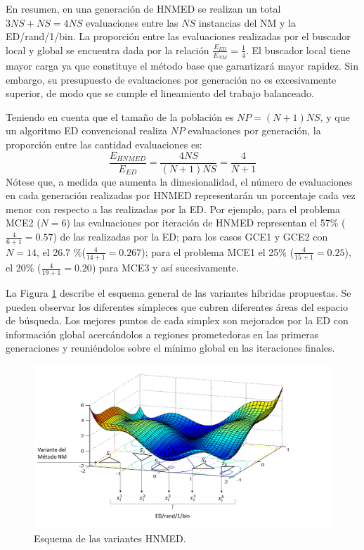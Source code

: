 En resumen, en una generación de HNMED se realizan un total $3NS+NS=4NS$ evaluaciones entre las $NS$ instancias del NM y la ED/rand/1/bin. La proporción entre las evaluaciones realizadas por el buscador local y global se encuentra dada por la relación $\frac{E_{ED}}{E_{NM}}=\frac{1}{4}$. El buscador local tiene mayor carga ya que constituye el método base que garantizará mayor rapidez. Sin embargo, su presupuesto de evaluaciones por generación no es excesivamente superior, de modo que se cumple el lineamiento del trabajo balanceado. 

Teniendo en cuenta que el tamaño de la población es $NP=(N+1)NS$, y que un algoritmo ED convencional realiza $NP$ evaluaciones por generación, la proporción entre las cantidad evaluaciones es:
\begin{equation}\label{eq:relación de evaluaciones}
\frac{E_{HNMED}}{E_{ED}}=\frac{4NS}{(N+1)NS}=\frac{4}{N+1}
\end{equation}
Nótese que, a medida que aumenta la dimesionalidad, el número de evaluaciones en cada generación realizadas por HNMED representarán un porcentaje cada vez menor con respecto a las realizadas por la ED. Por ejemplo, para el problema MCE2 ($N=6$) las evaluaciones por iteración de HNMED representan el 57\% ($\frac{4}{6+1}=0.57$) de las realizadas por la ED; para los casos GCE1 y GCE2 con $N=14$, el 26.7 \%($\frac{4}{14+1}=0.267$); para el problema MCE1 el 25\% ($\frac{4}{15+1}=0.25$), el 20\% ($\frac{4}{19+1}=0.20$) para MCE3 y así sucesivamente.

La Figura \ref{fig:HNMED} describe el esquema general de las variantes híbridas propuestas. Se pueden observar los diferentes símpleces que cubren diferentes áreas del espacio de búsqueda. Los mejores puntos de cada simplex son mejorados por la ED con información global acercándolos a regiones prometedoras en las primeras generaciones y reuniéndolos sobre el mínimo global en las iteraciones finales.

	\begin{figure}[htb]
		\begin{center}
		\includegraphics[width=\textwidth]{Figures/Esquema}
		\caption{Esquema de las variantes HNMED.}
		\label{fig:HNMED}
	\end{center}
	\end{figure}


